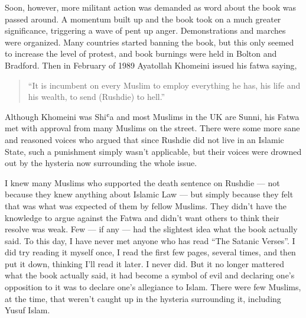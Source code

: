 \documentclass[12pt]{memoir}
\def\`{ʿ} %
\begin{document}
Soon, however, more militant action was demanded
as word about the book was passed around.
A momentum built up and the book took on a much greater significance,
triggering a wave of pent up anger.
Demonstrations and marches were organized.
Many countries started banning the book,
but this only seemed to increase the level of protest,
and book burnings were held in Bolton and Bradford.
Then in February of 1989 Ayatollah Khomeini issued his fatwa saying,

\begin{quote}
“It is incumbent on every Muslim to employ everything he has,
his life and his wealth, to send (Rushdie) to hell.”
\end{quote}

Although Khomeini was Shi\`a and most Muslims in the UK are Sunni,
his Fatwa met with approval from many Muslims on the street.
There were some more sane and reasoned voices
who argued that since Rushdie did not live in an Islamic State,
such a punishment simply wasn’t applicable,
but their voices were drowned out
by the hysteria now surrounding the whole issue.

I knew many Muslims who supported the death sentence on Rushdie —
not because they knew anything about Islamic Law —
but simply because they felt that was
what was expected of them by fellow Muslims.
They didn’t have the knowledge to argue against the Fatwa
and didn’t want others to think their resolve was weak.
Few — if any — had the slightest idea what the book actually said.
To this day, I have never met anyone who has read “The Satanic Verses”.
I did try reading it myself once, I read the first few pages,
several times, and then put it down, thinking I’ll read it later.
I never did.
But it no longer mattered what the book actually said,
it had become a symbol of evil and declaring one’s opposition to it
was to declare one’s allegiance to Islam.
There were few Muslims, at the time,
that weren’t caught up in the hysteria surrounding it, including Yusuf Islam.
\end{document}
